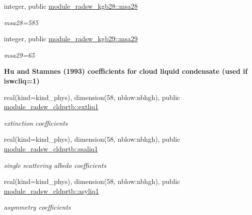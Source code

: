 \begin{DoxyCompactItemize}
\mbox{\label{namespacemodule__radsw__kgb28_a32c6693eb82a3ed47ed13e07f526471a}} 
integer, public \hyperlink{namespacemodule__radsw__kgb28_a32c6693eb82a3ed47ed13e07f526471a}{module\+\_\+radsw\+\_\+kgb28\+::msa28}
\begin{DoxyCompactList}\small\item\em msa28=585 \end{DoxyCompactList}\item 
\mbox{\label{namespacemodule__radsw__kgb29_adbee6e5d3b3efc437ff8815e42962b92}} 
integer, public \hyperlink{namespacemodule__radsw__kgb29_adbee6e5d3b3efc437ff8815e42962b92}{module\+\_\+radsw\+\_\+kgb29\+::msa29}
\begin{DoxyCompactList}\small\item\em msa29=65 \end{DoxyCompactList}\end{DoxyCompactItemize}
\begin{Indent}\textbf{ Hu and Stamnes (1993) coefficients for cloud liquid condensate (used if iswcliq=1)}\par
\begin{DoxyCompactItemize}
\item 
\mbox{\label{namespacemodule__radsw__cldprtb_ac68593a33577c720ca8c74eafb3c9f96}} 
real(kind=kind\+\_\+phys), dimension(58, nblow\+:nbhgh), public \hyperlink{namespacemodule__radsw__cldprtb_ac68593a33577c720ca8c74eafb3c9f96}{module\+\_\+radsw\+\_\+cldprtb\+::extliq1}
\begin{DoxyCompactList}\small\item\em extinction coefficients \end{DoxyCompactList}\item 
\mbox{\label{namespacemodule__radsw__cldprtb_a7944084ba9f240723dc93467ec66f825}} 
real(kind=kind\+\_\+phys), dimension(58, nblow\+:nbhgh), public \hyperlink{namespacemodule__radsw__cldprtb_a7944084ba9f240723dc93467ec66f825}{module\+\_\+radsw\+\_\+cldprtb\+::ssaliq1}
\begin{DoxyCompactList}\small\item\em single scattering albedo coefficients \end{DoxyCompactList}\item 
\mbox{\label{namespacemodule__radsw__cldprtb_a430be0720aa2e2ac46aa1ec7c9a9b64b}} 
real(kind=kind\+\_\+phys), dimension(58, nblow\+:nbhgh), public \hyperlink{namespacemodule__radsw__cldprtb_a430be0720aa2e2ac46aa1ec7c9a9b64b}{module\+\_\+radsw\+\_\+cldprtb\+::asyliq1}
\begin{DoxyCompactList}\small\item\em asymmetry coefficients \end{DoxyCompactList}\end{DoxyCompactItemize}
\end{Indent}
